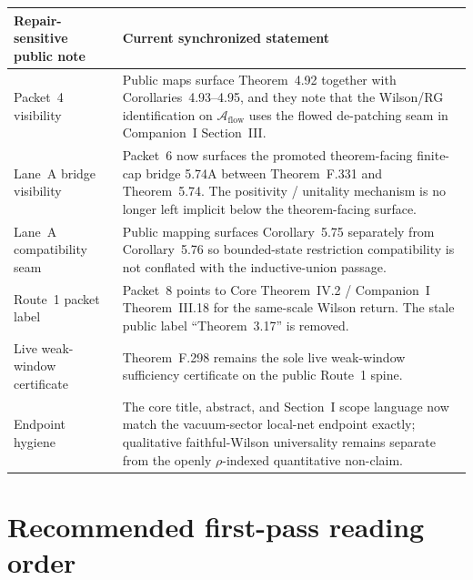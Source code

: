 \documentclass[11pt]{article}
\begin{document}
\begin{center}
\small
\begin{tabularx}{\linewidth}{@{}L{3.3cm}Y@{}}
\toprule
\textbf{Repair-sensitive public note} & \textbf{Current synchronized statement}\\
\midrule
Packet~4 visibility & Public maps surface Theorem~4.92 together with Corollaries~4.93--4.95, and they note that the Wilson/RG identification on $\mathcal A_{\mathrm{flow}}$ uses the flowed de-patching seam in Companion~I Section~III.\\
Lane~A bridge visibility & Packet~6 now surfaces the promoted theorem-facing finite-cap bridge 5.74A between Theorem~F.331 and Theorem~5.74. The positivity / unitality mechanism is no longer left implicit below the theorem-facing surface.\\
Lane~A compatibility seam & Public mapping surfaces Corollary~5.75 separately from Corollary~5.76 so bounded-state restriction compatibility is not conflated with the inductive-union passage.\\
Route~1 packet label & Packet~8 points to Core Theorem~IV.2 / Companion~I Theorem~III.18 for the same-scale Wilson return. The stale public label ``Theorem~3.17'' is removed.\\
Live weak-window certificate & Theorem~F.298 remains the sole live weak-window sufficiency certificate on the public Route~1 spine.\\
Endpoint hygiene & The core title, abstract, and Section~I scope language now match the vacuum-sector local-net endpoint exactly; qualitative faithful-Wilson universality remains separate from the openly $\rho$-indexed quantitative non-claim.\\
\bottomrule
\end{tabularx}
\end{center}

\section{Recommended first-pass reading order}
\end{document}
